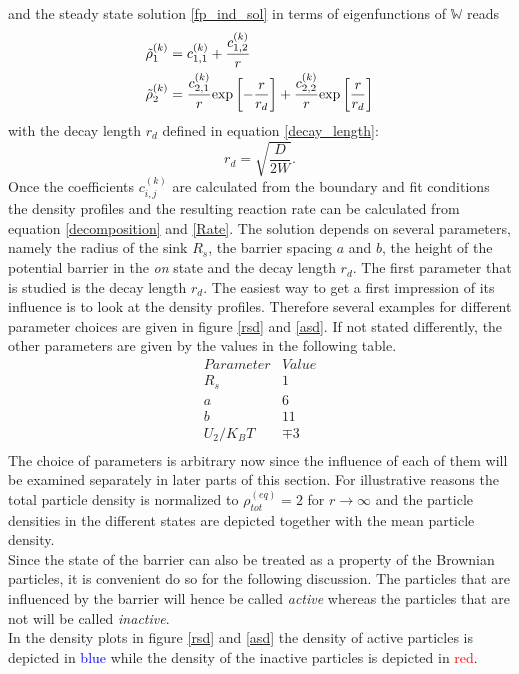 and the steady state solution \eqref{fp_ind_sol} in terms of eigenfunctions of $\mathbb{W}$ reads
\begin{align}
    \tilde{\rho}_1^{(k)} &= c_{1,1}^{(k)} + \frac{c_{1,2}^{(k)}}{r} \\
    \tilde{\rho}_2^{(k)} &= \frac{c_{2,1}^{(k)}}{r}{\rm exp}\left[-\frac{r}{r_d}\right]+ \frac{c_{2,2}^{(k)}}{r}{\rm exp}\left[\frac{r}{r_d}\right]
    \label{ind_sol_U2}
\end{align}
with the decay length $r_d$ defined in equation \eqref{decay_length}:
\begin{equation}
    r_d = \sqrt{\frac{D}{2W}}.
    \label{rd_two_state}
\end{equation}
Once the coefficients $c^{(k)}_{i,j}$ are calculated from the boundary and fit conditions the density profiles and the resulting reaction rate can be calculated from equation \eqref{decomposition} and \eqref{Rate}.
The solution depends on several parameters, namely the radius of the sink $R_s$, the barrier spacing $a$ and $b$, the height of the potential barrier in the \emph{on} state and the decay length $r_d$. The first parameter that is studied is the decay length $r_d$. The easiest way to get a first impression of its influence is to look at the density profiles. Therefore several examples for different parameter choices are given in figure \ref{rsd} and \ref{asd}.
If not stated differently, the other parameters are given by the values in the following table.
\begin{equation}
    \begin{array}{r|l}
        Parameter & Value \\ \hline
        R_s & 1 \\
        a   & 6 \\
        b   & 11 \\
        U_2/K_B T & \mp 3 \\
    \end{array} 
    \label{Parameters}
\end{equation}
 The choice of parameters is arbitrary now since the influence of each of them will be examined separately in later parts of this section.
For illustrative reasons the total particle density is normalized to $\rho_{tot}^{(eq)}=2$ for $r \rightarrow \infty$ and the particle densities in the different states are depicted together with the mean particle density. \\
Since the state of the barrier can also be treated as a property of the Brownian particles, it is convenient do so for the following discussion. The particles that are influenced by the barrier will hence be called \emph{active} whereas the particles that are not will be called \emph{inactive}. \\ In the density plots in figure \ref{rsd} and \ref{asd} the density of active particles is depicted in \textcolor{blue}{blue} while the density of the inactive particles is depicted in \textcolor{red}{red}. \\
